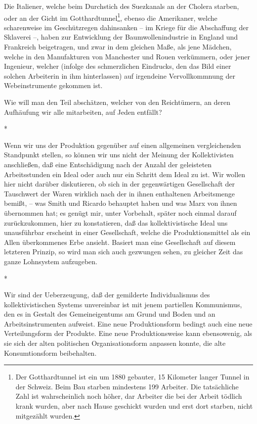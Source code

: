 \documentclass{scrbook}
\begin{document}
Die Italiener, welche beim Durchstich des Suezkanals an der Cholera starben, oder an der Gicht im Gotthardtunnel\footnote{Der Gotthardtunnel ist ein um 1880 gebauter, 15 Kilometer langer Tunnel in der Schweiz. Beim Bau starben mindestens 199 Arbeiter. Die tatsächliche Zahl ist wahrscheinlich noch höher, dar Arbeiter die bei der Arbeit tödlich krank wurden, aber nach Hause geschickt wurden und erst dort starben, nicht mitgezählt wurden.}, ebenso die Amerikaner, welche scharenweise im Geschützregen dahinsanken – im Kriege für die Abschaffung der Sklaverei –, haben zur Entwicklung der Baumwollenindustrie in England und Frankreich beigetragen, und zwar in dem gleichen Maße, als jene Mädchen, welche in den Manufakturen von Manchester und Rouen verkümmern, oder jener Ingenieur, welcher (infolge des schmerzlichen Eindrucks, den das Bild einer solchen Arbeiterin in ihm hinterlassen) auf irgendeine Vervollkommnung der Webeinstrumente gekommen ist.

Wie will man den Teil abschätzen, welcher von den Reichtümern‚ an deren Aufhäufung wir alle mitarbeiten, auf Jeden entfällt?

\begin{center}*\end{center}

Wenn wir uns der Produktion gegenüber auf einen allgemeinen vergleichenden Standpunkt stellen, so können wir uns nicht der Meinung der Kollektivisten anschließen, daß eine Entschädigung nach der Anzahl der geleisteten Arbeitsstunden ein Ideal oder auch nur ein Schritt dem Ideal zu ist. Wir wollen hier nicht darüber diskutieren, ob sich in der gegenwärtigen Gesellschaft der Tauschwert der Waren wirklich nach der in ihnen enthaltenen Arbeitsmenge bemißt, – was Smith und Ricardo behauptet haben und was Marx von ihnen übernommen hat; es genügt mir, unter Vorbehalt, später noch einmal darauf zurückzukommen, hier zu konstatieren, daß das kollektivistische Ideal uns unausführbar erscheint in einer Gesellschaft, welche die Produktionsmittel als ein Allen überkommenes Erbe ansieht. Basiert man eine Gesellschaft auf diesem letzteren Prinzip, so wird man sich auch gezwungen sehen, zu gleicher Zeit das ganze Lohnsystem aufzugeben.

\begin{center}*\end{center}

Wir sind der Ueberzeugung, daß der gemilderte Individualismus des kollektivistischen Systems unvereinbar ist mit jenem partiellen Kommunismus, den es in Gestalt des Gemeineigentums am Grund und Boden und an Arbeitsinstrumenten aufweist. Eine neue Produktionsform bedingt auch eine neue Verteilungsform der Produkte. Eine neue Produktionsweise kann ebensowenig, als sie sich der alten politischen Organisationsform anpassen konnte, die alte Konsumtionsform beibehalten.
\end{document}
